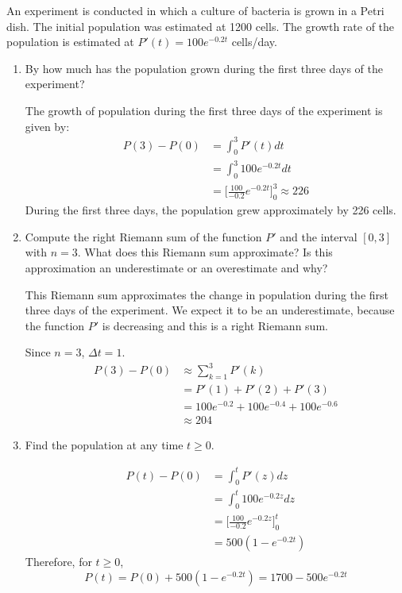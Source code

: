 \documentclass{ximera}
\begin{document}
\begin{example}
An experiment is conducted in which a culture of bacteria is grown in a Petri dish. The initial population was  estimated at 1200 cells. 
The  growth rate of the population is estimated at  $P'(t)=100e^{-0.2 t}$ cells/day.
\begin{enumerate}
\item By how much has the population grown during the first three days of the experiment?
\begin{explanation}
The growth of population during the first three days of the experiment is given by:
\begin{align*}
  P(3)-P(0) &=\int_0^3 P'(t) dt\\
  &=\int_0^3 100 e^{-0.2 t} dt\\
  &=\bigg[ \frac{100}{-0.2}e^{-0.2 t} \bigg]_0^3\approx 226
\end{align*}
During the first three  days, the population  grew  approximately by 226 cells. 
\end{explanation}

\item 
Compute the right Riemann sum of the function $P'$ and the interval $[0,3]$ with $n=3$.
What does this Riemann sum approximate?  Is this approximation an underestimate or an overestimate and why?


\begin{explanation}
This Riemann sum approximates the change in population during the first three days of the experiment.
We expect it to be an underestimate, because the function $P'$ is decreasing and this is a right Riemann sum.

Since $n=3$,  $\Delta t=1$.
\begin{align*}
  P(3)-P(0) &\approx\sum_{k=1}^3P'(k)\\
  &=P'(1)+P'(2)+P'(3)\\
  &=100e^{-0.2 }+100e^{-0.4}+100e^{-0.6}\\
  &\approx 204
\end{align*}
\end{explanation}
\item Find the population at any time $t\ge0$.
\begin{explanation}
\begin{align*}
  P(t)-P(0)&=\int_0^t P'(z) dz\\
  &=\int_0^t 100 e^{-0.2 z} dz\\
  &=\bigg[ \frac{100}{-0.2}e^{-0.2 z} \bigg]_0^t\\
  &=500\left(1-e^{-0.2 t}\right)
\end{align*}
Therefore, for $t\ge0$,
\[
P(t)=P(0)+500\left(1-e^{-0.2 t}\right)=1700 -500e^{-0.2 t}
\]
\end{explanation}
\end{enumerate}
\end{example}
\end{document}
